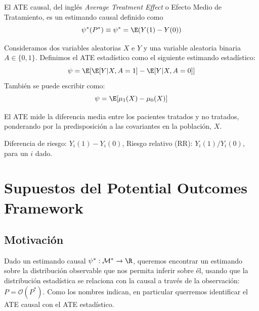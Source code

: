 \begin{definicion}\cite[sección 2.1]{mci}\label{def:causalATE}
	El ATE causal, del inglés \textit{Average Treatment Effect} o Efecto Medio de Tratamiento,
	es un estimando causal definido como
	$$ \psi^*(P^*) \equiv \psi^* = \E(Y(1) - Y(0)) $$
\end{definicion}

\begin{definicion} \label{def:ate} \cite[sección 1.3]{mci}
	Consideramos dos variables aleatorias $X$ e $Y$ y una variable aleatoria binaria $A \in \{0, 1\}$.
	Definimos el ATE estadístico como el siguiente estimando estadístico:
	$$ \psi = \E[ \E[Y | X, A = 1] - \E[Y | X, A = 0 ] ] $$
	También se puede escribir como:
	$$ \psi = \E[\mu_1(X) - \mu_0(X)] $$
\end{definicion}

\begin{observacion}[Interpretación] \cite[sección 1.3]{mci}
	El ATE mide la diferencia media entre los pacientes tratados y no tratados, ponderando
	por la predisposición a las covariantes en la población, $X$.
\end{observacion}






\begin{ejemplo}
	Diferencia de riesgo: $Y_i(1) - Y_i(0)$,
	Riesgo relativo (RR): $Y_i(1) / Y_i(0)$,
	para un $i$ dado.
\end{ejemplo}

\section{Supuestos del Potential Outcomes Framework}
\cite[capítulo 2.2]{mci}

\subsection{Motivación}
Dado un estimando causal $\psi^* : \mathcal{M}^* \to \R$, queremos encontrar
un estimando sobre la distribución observable que nos permita inferir sobre él,
usando que la distribución estadística se relaciona con la causal a través de
la observación: $P = \mathcal{O}(P^*)$.
Como los nombres indican, en particular querremos identificar el ATE causal con el ATE estadístico.

